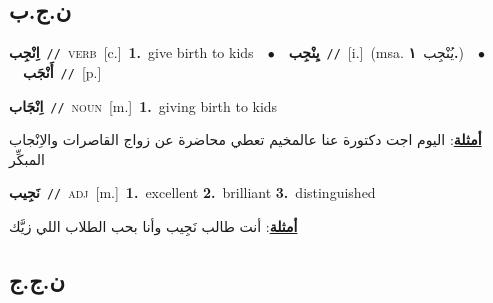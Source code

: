 \documentclass[10pt,a4paper,twoside]{article} %
\begin{document}
\begin{multicols}{2}
{{{{{{{{{{{{{{{{\vspace{-3mm}
\subsection*{\color{blue}\foreignlanguage{arabic}{ن.ج.ب}\color{blue}{}} 

{\setlength\topsep{0pt}\textbf{\foreignlanguage{arabic}{اِنْجِب}}\ {\color{gray}\texttt{//}\color{black}}\ \textsc{verb}\ [c.]\ \textbf{1.}~give birth to kids\ \ $\bullet$\ \ \setlength\topsep{0pt}\textbf{\foreignlanguage{arabic}{يِنْجِب}}\ {\color{gray}\texttt{//}\color{black}}\ [i.]\ \color{gray}(msa. \foreignlanguage{arabic}{يُنْجِب}~\foreignlanguage{arabic}{\textbf{١.}})\color{black}\ \ $\bullet$\ \ \setlength\topsep{0pt}\textbf{\foreignlanguage{arabic}{أَنْجَب}}\ {\color{gray}\texttt{//}\color{black}}\ [p.]\ 

{\setlength\topsep{0pt}\textbf{\foreignlanguage{arabic}{اِنْجَاب}}\ {\color{gray}\texttt{//}\color{black}}\ \textsc{noun}\ [m.]\ \textbf{1.}~giving birth to kids\  \begin{flushright}\color{gray}\foreignlanguage{arabic}{\textbf{\underline{\foreignlanguage{arabic}{أمثلة}}}: اليوم اجت دكتورة عنا عالمخيم تعطي محاضرة عن زواج القاصرات والاِنْجاب المبكِّر}\end{flushright}\color{black}} \vspace{2mm}

{\setlength\topsep{0pt}\textbf{\foreignlanguage{arabic}{نَجِيب}}\ {\color{gray}\texttt{//}\color{black}}\ \textsc{adj}\ [m.]\ \textbf{1.}~excellent  \textbf{2.}~brilliant  \textbf{3.}~distinguished\  \begin{flushright}\color{gray}\foreignlanguage{arabic}{\textbf{\underline{\foreignlanguage{arabic}{أمثلة}}}: أنت طالب نَجِيب وأنا بحب الطلاب اللي زيَّك}\end{flushright}\color{black}} \vspace{2mm}

\vspace{-3mm}
\subsection*{\color{blue}\foreignlanguage{arabic}{ن.ج.ج}\color{blue}{}} 

}}}}}}}}}}}}}}}}}
\end{multicols}
\end{document}
